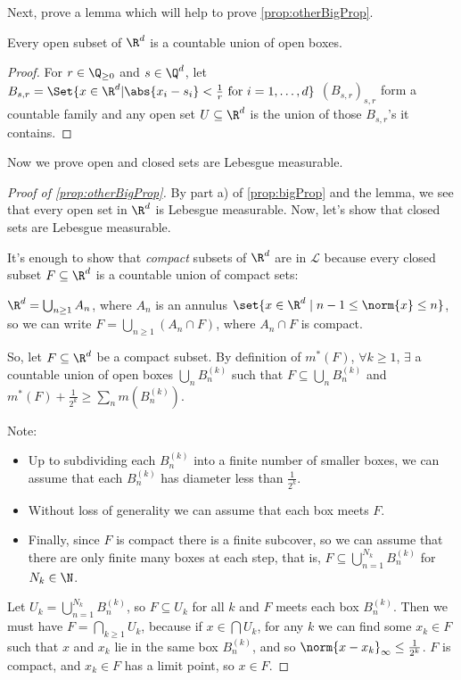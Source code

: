 \documentclass{article}
\newcommand{\1}[1]{\mathbbm{1}_{#1}}
\begin{document}
Next, prove a lemma which will help to prove \cref{prop:otherBigProp}.

\begin{lemma}
    Every open subset of $\R^d$ is a countable union of open boxes.
\end{lemma}

\begin{proof}
    For $r \in \Q_{\geq 0}$ and $s \in \Q^d$, let $B_{s, r} = \Set{x \in \R^d | \abs{x_i - s_i} < \frac1r \ \text{for} \ i=1,\dotsc,d}$
    $(B_{s,r})_{s,r}$ form a countable family and any open set $U \subseteq \R^d$ is the union of those $B_{s,r}$'s it contains.
\end{proof}

Now we prove open and closed sets are Lebesgue measurable.
\begin{proof}[Proof of \cref{prop:otherBigProp}]
    By part a) of \cref{prop:bigProp} and the lemma, we see that every open set in $\R^d$ is Lebesgue measurable. Now, let's show that closed sets are Lebesgue measurable.

    It's enough to show that \emph{compact} subsets of $\R^d$ are in $\mathcal{L}$ because every closed subset $F \subseteq \R^d$ is a countable union of compact sets:

    $\R^d = \bigcup_{n \geq 1} A_n$, where $A_n$ is an annulus $\set{x \in \R^d \mid n-1 \leq \norm{x} \leq n}$, so we can write $F = \bigcup_{n \geq 1} (A_n \cap F)$, where $A_n \cap F$ is compact.

    So, let $F \subseteq \R^d$ be a compact subset. By definition of $m^*(F)$, $\forall k \geq 1$, $\exists $ a countable union of open boxes $\bigcup_n B_n^{(k)}$ such that $F \subseteq \bigcup_n B_n^{(k)}$ and $m^*(F) + \frac{1}{2^k} \geq \sum_n m(B_n^{(k)})$.

    Note:
    \begin{itemize}
        \item Up to subdividing each $B_n^{(k)}$ into a finite number of smaller boxes, we can assume that each $B_n^{(k)}$ has diameter less than $\frac{1}{2^k}$.
        \item Without loss of generality we can assume that each box meets $F$.
        \item Finally, since $F$ is compact there is a finite subcover, so we can assume that there are only finite many boxes at each step, that is, $F \subseteq \bigcup_{n=1}^{N_k} B_n^{(k)}$ for $N_k \in \N$.
    \end{itemize}

    Let $U_k = \bigcup_{n=1}^{N_k} B_n^{(k)}$, so $F \subseteq U_k$ for all $k$ and $F$ meets each box $B_n^{(k)}$.
    Then we must have $F = \bigcap_{k \geq 1} U_k$, because if $x \in \bigcap U_k$, for any $k$ we can find some $x_k \in F$ such that $x$ and $x_k$ lie in the same box $B_n^{(k)}$, and so $\norm{x - x_k}_\infty \leq \frac1{2^k}$.
    $F$ is compact, and $x_k \in F$ has a limit point, so $x \in F$.


\end{proof}
\end{document}
